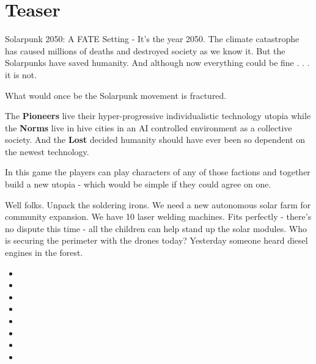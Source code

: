 \section{Teaser}

Solarpunk 2050: A FATE Setting - It's the year 2050. The climate catastrophe has caused millions of deaths and destroyed society as we know it. But the Solarpunks have saved humanity. And although now everything could be fine . . . it is not.

What would once be the Solarpunk movement is fractured.

The \textbf{Pioneers} live their hyper-progressive individualistic technology utopia while the \textbf{Norms} live in hive cities in an AI controlled environment as a collective society. And the \textbf{Lost} decided humanity should have ever been so dependent on the newest technology.

In this game the players can play characters of any of those factions and together build a new utopia - which would be simple if they could agree on one.

\begin{pioneertalk}[title=Pioneer Photovoltaik site]
    Well folks. Unpack the soldering irons. We need a new autonomous solar farm for community expansion.
    We have 10 laser welding machines. Fits perfectly - there's no dispute this time - all the children can help stand up the solar modules. Who is securing the perimeter with the drones today? Yesterday someone heard diesel engines in the forest.
\end{pioneertalk}

\begin{pioneertalk}[title=Pioneer Photovoltaics site - later]
    \begin{itemize}
        \item {}
        \item {}
        \item {}
        \item {}
        \item {}
        \item {}
        \item {}
        \item {}
    \end{itemize}
\end{pioneertalk}

